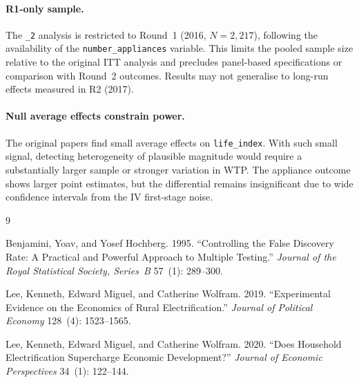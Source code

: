 \documentclass[12pt]{article}
\begin{document}
\paragraph{R1-only sample.}
The \texttt{\_2} analysis is restricted to Round~1 (2016, $N=2{,}217$),
following the availability of the \texttt{number\_appliances} variable.
This limits the pooled sample size relative to the original ITT analysis
and precludes panel-based specifications or comparison with Round~2
outcomes. Results may not generalise to long-run effects measured in R2
(2017).

\paragraph{Null average effects constrain power.}
The original papers find small average effects on \texttt{life\_index}.
With such small signal, detecting heterogeneity of plausible magnitude
would require a substantially larger sample or stronger variation in WTP.
The appliance outcome shows larger point estimates, but the differential
remains insignificant due to wide confidence intervals from the IV
first-stage noise.

\clearpage
\begin{singlespace}
\begin{thebibliography}{9}

Benjamini, Yoav, and Yosef Hochberg. 1995.
``Controlling the False Discovery Rate: A Practical and Powerful
Approach to Multiple Testing.''
\textit{Journal of the Royal Statistical Society, Series~B}
57~(1): 289--300.

Lee, Kenneth, Edward Miguel, and Catherine Wolfram. 2019.
``Experimental Evidence on the Economics of Rural Electrification.''
\textit{Journal of Political Economy} 128~(4): 1523--1565.

Lee, Kenneth, Edward Miguel, and Catherine Wolfram. 2020.
``Does Household Electrification Supercharge Economic Development?''
\textit{Journal of Economic Perspectives} 34~(1): 122--144.

\end{thebibliography}
\end{singlespace}
\end{document}
